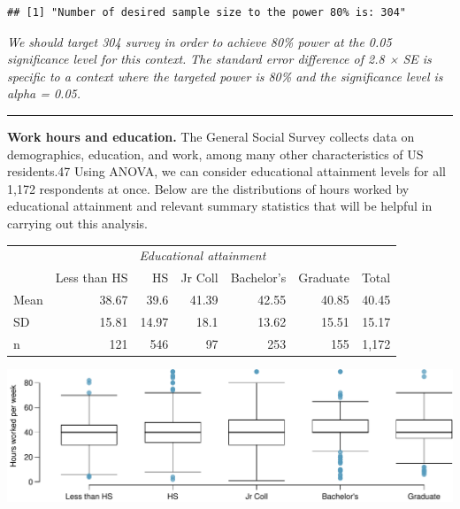 \documentclass[]{article}
\begin{document}
\begin{verbatim}
## [1] "Number of desired sample size to the power 80% is: 304"
\end{verbatim}

\emph{We should target 304 survey in order to achieve 80\% power at the
0.05 significance level for this context.} \emph{The standard error
difference of 2.8 × SE is specific to a context where the targeted power
is 80\% and the significance level is alpha = 0.05.}

\begin{center}\rule{0.5\linewidth}{\linethickness}\end{center}

\clearpage

\textbf{Work hours and education.} The General Social Survey collects
data on demographics, education, and work, among many other
characteristics of US residents.47 Using ANOVA, we can consider
educational attainment levels for all 1,172 respondents at once. Below
are the distributions of hours worked by educational attainment and
relevant summary statistics that will be helpful in carrying out this
analysis.

\begin{center}
\begin{tabular}{l  r  r  r  r  r  r}
                & \multicolumn{5}{c}{\textit{Educational attainment}} \\
\cline{2-6}
                & Less than HS  & HS    & Jr Coll   & Bachelor's & Graduate & Total \\
\hline
Mean            & 38.67         & 39.6  & 41.39     & 42.55     & 40.85     & 40.45 \\
SD              & 15.81         & 14.97 & 18.1      & 13.62     & 15.51     & 15.17 \\
n               & 121           & 546   & 97        & 253       & 155       & 1,172 \\
\hline
\end{tabular}
\end{center}

\includegraphics{Homework_7_files/figure-latex/unnamed-chunk-10-1.pdf}
\end{document}
